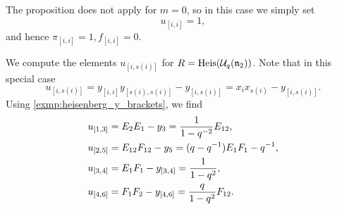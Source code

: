 The proposition does not apply for $m = 0$, so in this case we simply set
\begin{equation*}
	u_{[i, i]} = 1,
\end{equation*}
and hence $\pi_{[i,i]} = 1, f_{[i,i]} = 0$.

\begin{example}\label{exmp:heisenberg_u_bracket}

	We compute the elements $u_{[i, s(i)]}$ for $R = \operatorname{Heis}(\mathcal{U}_q(\mathfrak{n}_2))$. Note
	that in this special case
	\begin{equation*}
		u_{[i, s(i)]} = y_{[i, i]}y_{[s(i), s(i)]} - y_{[i, s(i)]} = x_i x_{s(i)} - y_{[i, s(i)]}.
	\end{equation*}
	Using \cref{exmp:heisenberg_y_brackets}, we find
	\begin{align*}
		 & u_{[1,3]} = E_2 E_1 - y_3 = \frac{1}{1-q^{-2}}E_{12},        \\
		 & u_{[2,5]} = E_{12}F_{12} - y_5 = (q - q^{-1})E_1F_1 - q^{-1}, \\
		 & u_{[3,4]} = E_1 F_1 - y_{[3,4]} = \frac{1}{1-q^2},           \\
		 & u_{[4,6]} = F_1 F_2 - y_{[4,6]} = \frac{q}{1-q^2}F_{12}.
	\end{align*}
\end{example}

